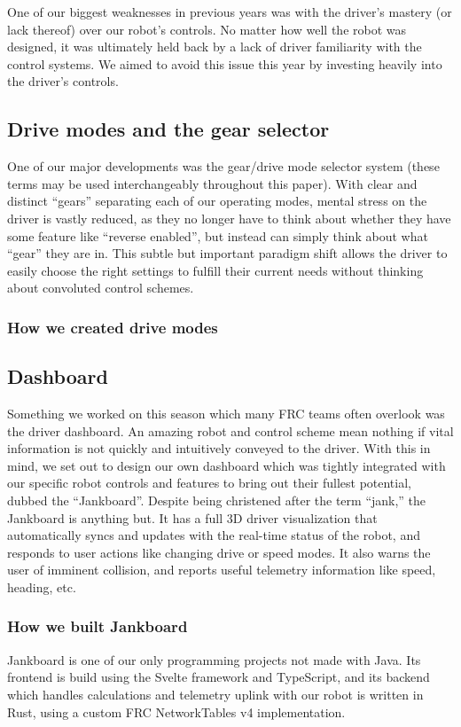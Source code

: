 One of our biggest weaknesses in previous years was with the driver's
mastery (or lack thereof) over our robot's controls. No matter how well
the robot was designed, it was ultimately held back by a lack of driver
familiarity with the control systems. We aimed to avoid this issue this
year by investing heavily into the driver's controls.

\subsection{Drive modes and the gear selector}

One of our major developments was the gear/drive mode selector system
(these terms may be used interchangeably throughout this paper). With
clear and distinct ``gears'' separating each of our operating modes,
mental stress on the driver is vastly reduced, as they no longer have to
think about whether they have some feature like ``reverse enabled'', but
instead can simply think about what ``gear'' they are in. This subtle
but important paradigm shift allows the driver to easily choose the
right settings to fulfill their current needs without thinking about
convoluted control schemes.

\subsubsection{How we created drive modes}
\blindtext{}

\subsection{Dashboard}

Something we worked on this season which many FRC teams often overlook
was the driver dashboard. An amazing robot and control scheme mean
nothing if vital information is not quickly and intuitively conveyed to
the driver. With this in mind, we set out to design our own dashboard
which was tightly integrated with our specific robot controls and
features to bring out their fullest potential, dubbed the ``Jankboard''.
Despite being christened after the term ``jank,'' the Jankboard is
anything but. It has a full 3D driver visualization that automatically
syncs and updates with the real-time status of the robot, and responds
to user actions like changing drive or speed modes. It also warns the
user of imminent collision, and reports useful telemetry information
like speed, heading, etc.

\subsubsection{How we built Jankboard}

Jankboard is one of our only programming projects not made with Java.
Its frontend is build using the Svelte framework and TypeScript, and its
backend which handles calculations and telemetry uplink with our robot
is written in Rust, using a custom FRC NetworkTables v4 implementation.
